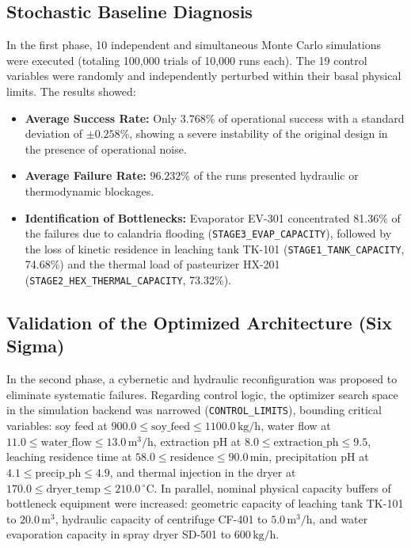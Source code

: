 \documentclass[10pt,letterpaper,twocolumn]{article}
\begin{document}
\subsection{Stochastic Baseline Diagnosis}

In the first phase, 10 independent and simultaneous Monte Carlo simulations were executed (totaling 100,000 trials of 10,000 runs each). The 19 control variables were randomly and independently perturbed within their basal physical limits. The results showed:
\begin{itemize}
    \item \textbf{Average Success Rate:} Only $3.768\%$ of operational success with a standard deviation of $\pm 0.258\%$, showing a severe instability of the original design in the presence of operational noise.
    \item \textbf{Average Failure Rate:} $96.232\%$ of the runs presented hydraulic or thermodynamic blockages.
    \item \textbf{Identification of Bottlenecks:} Evaporator EV-301 concentrated 81.36\% of the failures due to calandria flooding (\texttt{STAGE3\_EVAP\_CAPACITY}), followed by the loss of kinetic residence in leaching tank TK-101 (\texttt{STAGE1\_TANK\_CAPACITY}, 74.68\%) and the thermal load of pasteurizer HX-201 (\texttt{STAGE2\_HEX\_THERMAL\_CAPACITY}, 73.32\%).
\end{itemize}

\subsection{Validation of the Optimized Architecture (Six Sigma)}

In the second phase, a cybernetic and hydraulic reconfiguration was proposed to eliminate systematic failures. Regarding control logic, the optimizer search space in the simulation backend was narrowed (\texttt{CONTROL\_LIMITS}), bounding critical variables: soy feed at $900.0 \le \text{soy\_feed} \le 1100.0\,\text{kg/h}$, water flow at $11.0 \le \text{water\_flow} \le 13.0\,\text{m}^3/\text{h}$, extraction pH at $8.0 \le \text{extraction\_ph} \le 9.5$, leaching residence time at $58.0 \le \text{residence} \le 90.0\,\text{min}$, precipitation pH at $4.1 \le \text{precip\_ph} \le 4.9$, and thermal injection in the dryer at $170.0 \le \text{dryer\_temp} \le 210.0\,^\circ\text{C}$. In parallel, nominal physical capacity buffers of bottleneck equipment were increased: geometric capacity of leaching tank TK-101 to $20.0\,\text{m}^3$, hydraulic capacity of centrifuge CF-401 to $5.0\,\text{m}^3/\text{h}$, and water evaporation capacity in spray dryer SD-501 to $600\,\text{kg/h}$.
\end{document}
